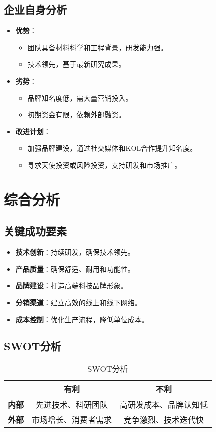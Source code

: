 \documentclass[UTF8]{report}
\theoremstyle{MyLineTheoremStyle} %
\theoremstyle{MyBlockTheoremStyle} %
\theoremstyle{MySubsubsectionStyle} %
\begin{document}
\section{企业自身分析}
\begin{itemize}
    \item \textbf{优势}：
        \begin{itemize}
            \item 团队具备材料科学和工程背景，研发能力强。
            \item 技术领先，基于最新研究成果。
        \end{itemize}
    \item \textbf{劣势}：
        \begin{itemize}
            \item 品牌知名度低，需大量营销投入。
            \item 初期资金有限，依赖外部融资。
        \end{itemize}
    \item \textbf{改进计划}：
        \begin{itemize}
            \item 加强品牌建设，通过社交媒体和KOL合作提升知名度。
            \item 寻求天使投资或风险投资，支持研发和市场推广。
        \end{itemize}
\end{itemize}

\chapter{综合分析}
\section{关键成功要素}
\begin{itemize}
    \item \textbf{技术创新}：持续研发，确保技术领先。
    \item \textbf{产品质量}：确保舒适、耐用和功能性。
    \item \textbf{品牌建设}：打造高端科技品牌形象。
    \item \textbf{分销渠道}：建立高效的线上和线下网络。
    \item \textbf{成本控制}：优化生产流程，降低单位成本。
\end{itemize}

\section{SWOT分析}
\begin{table}[h]
    \centering
    \begin{tabular}{|c|c|c|}
        \hline
         & \textbf{有利} & \textbf{不利} \\
        \hline
        \textbf{内部} & 先进技术、科研团队 & 高研发成本、品牌认知低 \\
        \hline
        \textbf{外部} & 市场增长、消费者需求 & 竞争激烈、技术迭代快 \\
        \hline
    \end{tabular}
    \caption{SWOT分析}
\end{table}
\end{document}
